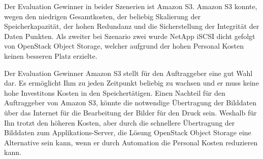 Der Evaluation Gewinner in beider Szenerien ist Amazon S3. Amazon S3 konnte, wegen den niedrigen Gesamtkosten, der beliebig Skalierung der Speicherkapazität, der hohen Redundanz und die Sicherstellung der Integrität der Daten Punkten. Als zweiter bei Szenario zwei wurde NetApp iSCSI dicht gefolgt von OpenStack Object Storage, welcher aufgrund der hohen Personal Kosten keinen besseren Platz erzielte.

Der Evaluation Gewinner Amazon S3 stellt für den Auftraggeber eine gut Wahl dar. Es ermöglicht Ihm zu jeden Zeitpunkt beliebig zu wachsen und er muss keine hohe Investitons Kosten in den Speichertätigen. Einen Nachteil für den Auftraggeber von Amazon S3, könnte die notwendige Übertragung der Bilddaten über das Internet für die Bearbeitung der Bilder für den Druck sein. Weshalb für Ihn trotzt den höheren Kosten, aber durch die schnellere Übertragung der Bilddaten zum Applikations-Server, die Lösung OpenStack Object Storage eine Alternative sein kann, wenn er durch Automation die Personal Kosten reduzieren kann.